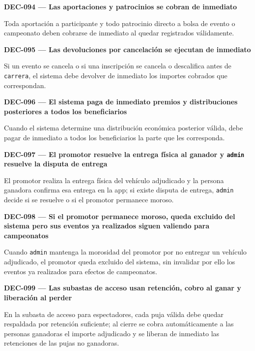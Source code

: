 \documentclass[10pt,letterpaper]{article}
\begin{document}
\noindent\textbf{DEC-094 --- Las aportaciones y patrocinios se cobran de inmediato}\par
Toda aportación a participante y todo patrocinio directo a bolsa de evento o campeonato deben cobrarse de inmediato al quedar registrados válidamente.\par\vspace{0.45em}
\noindent\textbf{DEC-095 --- Las devoluciones por cancelación se ejecutan de inmediato}\par
Si un evento se cancela o si una inscripción se cancela o descalifica antes de \texttt{carrera}, el sistema debe devolver de inmediato los importes cobrados que correspondan.\par\vspace{0.45em}
\noindent\textbf{DEC-096 --- El sistema paga de inmediato premios y distribuciones posteriores a todos los beneficiarios}\par
Cuando el sistema determine una distribución económica posterior válida, debe pagar de inmediato a todos los beneficiarios la parte que les corresponda.\par\vspace{0.45em}
\noindent\textbf{DEC-097 --- El promotor resuelve la entrega física al ganador y \texttt{admin} resuelve la disputa de entrega}\par
El promotor realiza la entrega física del vehículo adjudicado y la persona ganadora confirma esa entrega en la app; si existe disputa de entrega, \texttt{admin} decide si se resuelve o si el promotor permanece moroso.\par\vspace{0.45em}
\noindent\textbf{DEC-098 --- Si el promotor permanece moroso, queda excluido del sistema pero sus eventos ya realizados siguen valiendo para campeonatos}\par
Cuando \texttt{admin} mantenga la morosidad del promotor por no entregar un vehículo adjudicado, el promotor queda excluido del sistema, sin invalidar por ello los eventos ya realizados para efectos de campeonatos.\par\vspace{0.45em}
\noindent\textbf{DEC-099 --- Las subastas de acceso usan retención, cobro al ganar y liberación al perder}\par
En la subasta de acceso para espectadores, cada puja válida debe quedar respaldada por retención suficiente; al cierre se cobra automáticamente a las personas ganadoras el importe adjudicado y se liberan de inmediato las retenciones de las pujas no ganadoras.\par\vspace{0.45em}
\end{document}

